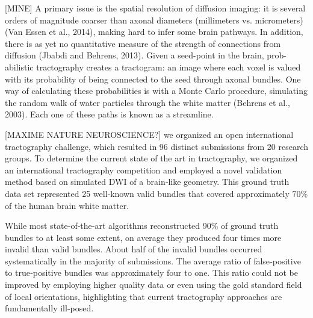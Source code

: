 [MINE]
A primary issue is the spatial resolution of diffusion imaging:
it is several orders of magnitude coarser than axonal diameters (millimeters vs. micrometers) (Van Essen et al., 2014), making hard to infer some brain pathways.
In addition, there is as yet no quantitative measure of the strength of connections from diffusion (Jbabdi and Behrens, 2013).
Given a seed-point in the brain, prob- abilistic tractography creates a tractogram:
an image where each voxel is valued with its probability of being connected to the seed through axonal bundles.
One way of calculating these probabilities is with a Monte Carlo procedure, simulating the random walk of water particles through the white matter (Behrens et al., 2003).
Each one of these paths is known as a streamline.

[MAXIME NATURE NEUROSCIENCE?]
we organized an open international tractography challenge, which resulted in 96 distinct submissions from 20 research groups.
To determine the current state of the art in tractography, we organized  an  international tractography competition and employed a novel validation method based on simulated DWI of a brain‐like geometry.
This ground truth data set represented 25 well‐known valid bundles that covered approximately 70\% of the human brain white matter.

While most state‐of‐the‐art algorithms  reconstructed 90\% of ground truth bundles to at least some extent, on average they produced four times more invalid than valid  bundles. About half of the invalid bundles occurred systematically in the majority of submissions. 
The average ratio of false‐positive to true‐positive bundles was approximately four to one.
This ratio could not be improved by employing higher quality data or even using the gold standard field of local orientations, highlighting that current tractography approaches are fundamentally ill‐posed.


